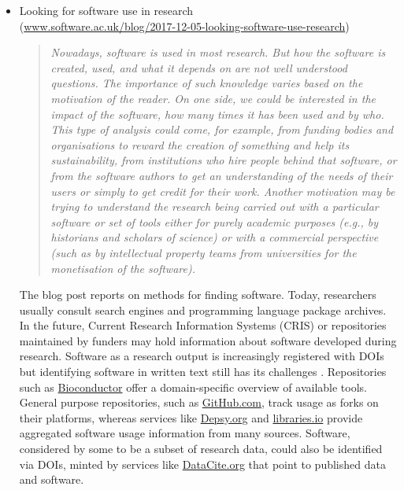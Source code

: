 \documentclass[11pt,letterpaper]{article}
\begin{document}
\begin{itemize}
\item Looking for software use in research \\(\href{https://www.software.ac.uk/blog/2017-12-05-looking-software-use-research}
{www.software.ac.uk/blog/2017-12-05-looking-software-use-research})
\begin{quote}\textit{
Nowadays, software is used in most research. But how the software is created, used, and what it depends on are not well understood questions. The importance of such knowledge varies based on the motivation of the reader. On one side, we could be interested in the impact of the software, how many times it has been used and by who. This type of analysis could come, for example, from funding bodies and organisations to reward the creation of something and help its sustainability, from institutions who hire people behind that software, or from the software authors to get an understanding of the needs of their users or simply to get credit for their work. Another motivation may be trying to understand the research being carried out with a particular software or set of tools either for purely academic purposes (e.g., by historians and scholars of science) or with a commercial perspective (such as by intellectual property teams from universities for the monetisation of the software).} %
\end{quote}
The blog post reports on methods for finding software. Today, researchers usually consult search engines and programming language package archives. In the future, Current Research Information Systems (CRIS) or repositories maintained by funders may hold information about software developed during research. Software as a research output is increasingly registered with DOIs \cite{Fenner2018DOI} but identifying software in written text still has its challenges \cite{Li2017R}. Repositories such as \href{https://www.bioconductor.org/}{Bioconductor} offer a domain-specific overview of available tools. General purpose repositories, such as \href{http://github.com}{GitHub.com}, track usage as forks on their platforms, whereas services like \href{http://dpesy.org}{Depsy.org} and \href{https://libraries.io/}{libraries.io} provide aggregated software usage information from many sources. %
Software, considered by some to be a subset of research data, could also be identified via DOIs, minted by services like \href{http://datacite.org}{DataCite.org} that point to published data and software. 

\end{itemize}
\end{document}
